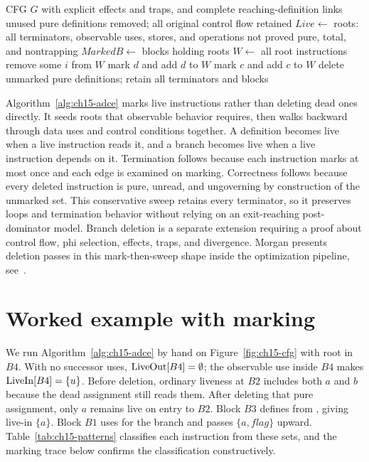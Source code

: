 \begin{algorithm}
\caption{Conservative marking-based dead-code elimination}\label{alg:ch15-adce}
\begin{pseudocode}
\Require CFG $G$ with explicit effects and traps, and complete reaching-definition links
\Ensure unused pure definitions removed; all original control flow retained
\State $Live \gets$ roots: all terminators, observable uses, stores, and operations not proved pure, total, and nontrapping
\State $MarkedB \gets$ blocks holding roots
\State $W \gets$ all root instructions
\State remove some $i$ from $W$
\State mark $d$ and add $d$ to $W$
\EndIf
\EndFor
\EndFor
{}
\State mark $c$ and add $c$ to $W$
\EndIf
\EndFor
\EndWhile
\State delete unmarked pure definitions; retain all terminators and blocks
\end{pseudocode}
\end{algorithm}

Algorithm~\ref{alg:ch15-adce} marks live instructions rather than deleting dead ones directly.
It seeds roots that observable behavior requires, then walks backward through data uses and control conditions together.
A definition becomes live when a live instruction reads it, and a branch becomes live when a live instruction depends on it.
Termination follows because each instruction marks at most once and each edge is examined on marking.
Correctness follows because every deleted instruction is pure, unread, and ungoverning by construction of the unmarked set.
This conservative sweep retains every terminator, so it preserves loops and termination behavior without relying on an exit-reaching post-dominator model.
Branch deletion is a separate extension requiring a proof about control flow, phi selection, effects, traps, and divergence.
Morgan presents deletion passes in this mark-then-sweep shape inside the optimization pipeline, see~\cite{morgan-1998-optimizing}.
\section{Worked example with marking}
\label{sec:ch15-worked}

We run Algorithm~\ref{alg:ch15-adce} by hand on Figure~\ref{fig:ch15-cfg} with root  in $B4$.
With no successor uses, $\mathrm{LiveOut}[B4]=\emptyset$; the observable use inside $B4$ makes $\mathrm{LiveIn}[B4]=\{u\}$.
Before deletion, ordinary liveness at $B2$ includes both $a$ and $b$ because the dead assignment  still reads them.
After deleting that pure assignment, only $a$ remains live on entry to $B2$.
Block $B3$ defines  from , giving live-in $\{a\}$.
Block $B1$ uses  for the branch and passes $\{a, flag\}$ upward.
Table~\ref{tab:ch15-patterns} classifies each instruction from these sets, and the marking trace below confirms the classification constructively.

